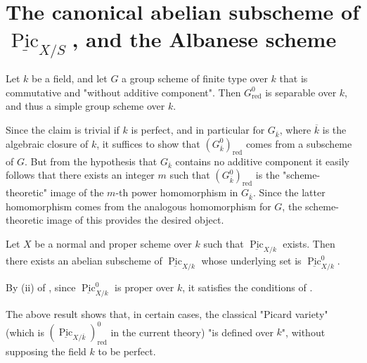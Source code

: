\section{The canonical abelian subscheme of $\underline{\operatorname{Pic}}_{X/S}$, and the Albanese scheme}\label{fga3.vi-3}


\begin{proposition}\label{fga3.vi-3-proposition-3.1}
    Let $k$ be a field, and let $G$ a group scheme of finite type over $k$ that is commutative and "without additive component".
    Then $G_\mathrm{red}^0$ is separable over $k$, and thus a simple group scheme over $k$.
\end{proposition}

\begin{cproof}
    Since the claim is trivial if $k$ is perfect, and in particular for $G_{\overline{k}}$, where $\overline{k}$ is the algebraic closure of $k$, it suffices to show that $(G_{\overline{k}}^0)_\mathrm{red}$ comes from a subscheme of $G$.
    But from the hypothesis that $G_{\overline{k}}$ contains no additive component it easily follows that there exists an integer $m$ such that $(G_{\overline{k}}^0)_\mathrm{red}$ is the "scheme-theoretic" image of the $m$-th power homomorphism in $G_{\overline{k}}$.
    Since the latter homomorphism comes from the analogous homomorphism for $G$, the scheme-theoretic image of this provides the desired object.
\end{cproof}

\begin{corollary}\label{fga3.vi-3-corollary-3.2}
    Let $X$ be a normal and proper scheme over $k$ such that $\underline{\operatorname{Pic}}_{X/k}$ exists.
    Then there exists an abelian subscheme of $\underline{\operatorname{Pic}}_{X/k}$ whose underlying set is $\underline{\operatorname{Pic}}_{X/k}^0$.
\end{corollary}

\begin{cproof}
    By (ii) of , since $\underline{\operatorname{Pic}}_{X/k}^0$ is proper over $k$, it satisfies the conditions of .
\end{cproof}


The above result shows that, in certain cases, the classical "Picard variety" (which is $(\underline{\operatorname{Pic}}_{X/\overline{k}})_\mathrm{red}^0$ in the current theory) "is defined over $k$", without supposing the field $k$ to be perfect.

